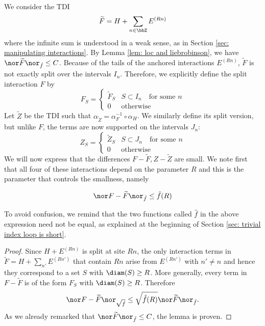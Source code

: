 We consider  the TDI 
\begin{equation}\label{F tilde}
	\widetilde F=H+\sum_{n \in \bbZ} E^{(Rn)}
\end{equation}
where the infinite sum is understood in a weak sense, as in Section \ref{sec: manipulating interactions}. By Lemma \ref{lem: loc and liebrobinson}, we have $\nor\widetilde F\nor_{\hat{f}}\leq C$.
Because of the tails of the anchored interactions $E^{(Rn)}$, $\widetilde F$ is not exactly split over the intervals $I_n$.
Therefore, we explicitly define the split interaction $F$ by
$$
F_S=\begin{cases}  \widetilde F_S & S \subset I_n \quad \text{for some $n$} \\
	0  & \text{otherwise}
\end{cases}
$$
Let $\widetilde Z$ be the TDI 
such that  $\alpha_{\widetilde Z}=\alpha_{F}^{-1} \circ \alpha_H$. We similarly define its split version, but unlike $F$, the terms are now supported on the intervals $J_n$:
$$
Z_S=\begin{cases}  \widetilde Z_S & S \subset J_n \quad \text{for some $n$} \\
	0  & \text{otherwise}
\end{cases}
$$
We will now express that the differences $F-\widetilde F, Z-\widetilde Z$ are small. We note first that all four of these interactions depend on the parameter $R$ and this is the parameter that controls the smallness, namely
\begin{lemma}\label{lem: small difference f}
	$$
	\nor F-\widetilde F\nor_{\hat{f}} \leq \hat{f}(R)
	$$
\end{lemma}
To avoid confusion, we remind that the two functions called $\hat{f}$ in the above expression need not be equal,  as explained at the beginning of Section \ref{sec: trivial index loop is short}.
\begin{proof} 
	Since $H+E^{(Rn)}$ is split at site $Rn$, the only interaction terms in $\widetilde F=H+\sum_{n'} E^{(Rn')}$ that contain $Rn$ arise from  $ E^{(Rn')}$ with $n' \neq n$ and hence they correspond to a set $S$ with $\diam(S)\geq R$. More generally, every term in $F-\widetilde F$ is of the form $F_S$  with  $\diam(S)\geq R$. Therefore
	$$\nor F-\widetilde F\nor_{\sqrt{\hat{f}}} \leq \sqrt{\hat{f}(R)}  \nor \widetilde F \nor_{\hat{f}}. $$
	As we already remarked that $\nor \widetilde F \nor_{\hat{f}}\leq C$, the lemma is proven.
\end{proof}


